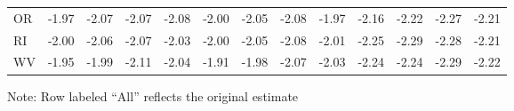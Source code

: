 \begin{landscape}
\begin{table}
\begin{tabular}{lrrrr|rrrr|rrrr}
OR & -1.97 & -2.07 & -2.07 & -2.08 & -2.00 & -2.05 & -2.08 & -1.97 & -2.16 & -2.22 & -2.27 & -2.21 \\ 
RI & -2.00 & -2.06 & -2.07 & -2.03 & -2.00 & -2.05 & -2.08 & -2.01 & -2.25 & -2.29 & -2.28 & -2.21 \\ 
WV & -1.95 & -1.99 & -2.11 & -2.04 & -1.91 & -1.98 & -2.07 & -2.03 & -2.24 & -2.24 & -2.29 & -2.22 \\ 
 \hline
\end{tabular}
\begin{tablenotes}
  \item Note: Row labeled ``All'' reflects the original estimate
\end{tablenotes}
\end{table}

\end{landscape}

\clearpage

